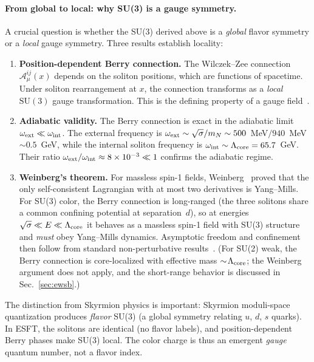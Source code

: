 \documentclass[a4paper,12pt]{article}
\begin{document}
\paragraph{From global to local: why SU(3) is a gauge symmetry.}
A crucial question is whether the SU(3) derived above is a
\emph{global} flavor symmetry or a \emph{local} gauge symmetry.
Three results establish locality:
\begin{enumerate}
 \item \textbf{Position-dependent Berry connection.}
 The Wilczek--Zee connection $\mathcal{A}_\mu^{ij}(x)$ depends on
 the soliton positions, which are functions of spacetime. Under
 soliton rearrangement at $x$, the connection transforms as a
 \emph{local} $\mathrm{SU}(3)$ gauge transformation. This is the
 defining property of a gauge field~\cite{WZ1984}.
 \item \textbf{Adiabatic validity.}
 The Berry connection is exact in the adiabatic limit
 $\omega_{\rm ext} \ll \omega_{\rm int}$. The external frequency
 is $\omega_{\rm ext} \sim \sqrt{\sigma}/m_N \sim 500$~MeV$/940$~MeV
 $\sim 0.5$~GeV, while the internal soliton frequency is
 $\omega_{\rm int} \sim \Lambda_{\rm core} = 65.7$~GeV. Their ratio
 $\omega_{\rm ext}/\omega_{\rm int} \approx 8\times 10^{-3} \ll 1$
 confirms the adiabatic regime.
 \item \textbf{Weinberg's theorem.}
 For massless spin-1 fields, Weinberg~\cite{Weinberg1979} proved
 that the only self-consistent Lagrangian with at most two
 derivatives is Yang--Mills. For SU(3) color, the Berry connection
 is long-ranged (the three solitons share a common confining
 potential at separation~$d$), so at energies
 $\sqrt{\sigma} \ll E \ll \Lambda_{\rm core}$ it behaves as a
 massless spin-1 field with SU(3) structure and \emph{must} obey
 Yang--Mills dynamics. Asymptotic freedom and confinement then
 follow from standard non-perturbative results~\cite{Wilson1974}.
 (For SU(2) weak, the Berry connection is core-localized with
 effective mass $\sim\!\Lambda_{\rm core}$; the Weinberg argument
 does not apply, and the short-range behavior is discussed
 in Sec.~\ref{sec:ewsb}.)
\end{enumerate}
The distinction from Skyrmion physics is important: Skyrmion
moduli-space quantization produces \emph{flavor} SU(3) (a global
symmetry relating $u$, $d$, $s$ quarks). In ESFT, the solitons
are identical (no flavor labels), and position-dependent Berry
phases make SU(3) local. The color charge is thus an emergent
\emph{gauge} quantum number, not a flavor index.
\end{document}
